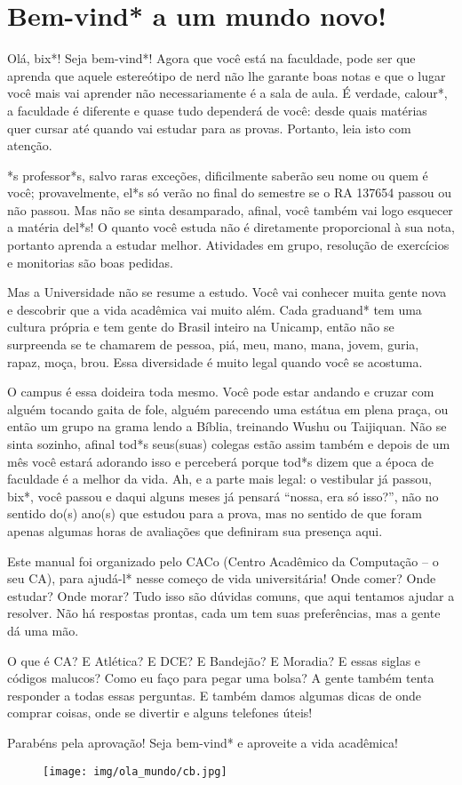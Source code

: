 
\section{Bem-vind* a um mundo novo!}

Olá, bix*! Seja bem-vind*! Agora que você está na faculdade, pode ser que
aprenda que aquele estereótipo de nerd não lhe garante boas notas e que o lugar
você mais vai aprender não necessariamente é a sala de aula. É verdade,
calour*, a faculdade é diferente e quase tudo dependerá de você: desde quais
matérias quer cursar até quando vai estudar para as provas. Portanto, leia isto
com atenção.

*s professor*s, salvo raras exceções, dificilmente saberão seu nome ou quem é
você; provavelmente, el*s só verão no final do semestre se o RA 137654 passou
ou não passou. Mas não se sinta desamparado, afinal, você também vai logo
esquecer a matéria del*s! O quanto você estuda não é diretamente proporcional à
sua nota, portanto aprenda a estudar melhor. Atividades em grupo, resolução de
exercícios e monitorias são boas pedidas.

Mas a Universidade não se resume a estudo. Você vai conhecer muita gente nova e
descobrir que a vida acadêmica vai muito além.  Cada graduand* tem uma cultura
própria e tem gente do Brasil inteiro na Unicamp, então não se surpreenda se te
chamarem de pessoa, piá, meu, mano, mana, jovem, guria, rapaz, moça, brou.
Essa diversidade é muito legal quando você se acostuma.

O campus é essa doideira toda mesmo. Você pode estar andando e cruzar com
alguém tocando gaita de fole, alguém parecendo uma estátua em plena praça, ou
então um grupo na grama lendo a Bíblia, treinando Wushu ou Taijiquan. Não se
sinta sozinho, afinal tod*s seus(suas) colegas estão assim também e depois de
um mês você estará adorando isso e perceberá porque tod*s dizem que a época de
faculdade é a melhor da vida. Ah, e a parte mais legal: o vestibular já passou,
bix*, você passou e daqui alguns meses já pensará ``nossa, era só isso?'', não
no sentido do(s) ano(s) que estudou para a prova, mas no sentido de que foram
apenas algumas horas de avaliações que definiram sua presença aqui.

Este manual foi organizado pelo CACo (Centro Acadêmico da Computação -- o seu
CA), para ajudá-l* nesse começo de vida universitária! Onde comer? Onde
estudar? Onde morar? Tudo isso são dúvidas comuns, que aqui tentamos ajudar a
resolver. Não há respostas prontas, cada um tem suas preferências, mas a gente
dá uma mão.

O que é CA? E Atlética? E DCE? E Bandejão? E Moradia? E essas siglas e códigos
malucos? Como eu faço para pegar uma bolsa? A gente também tenta responder a
todas essas perguntas. E também damos algumas dicas de onde comprar coisas,
onde se divertir e alguns telefones úteis!

Parabéns pela aprovação! Seja bem-vind* e aproveite a vida acadêmica!

\begin{figure}[t]
    \texttt{[image: img/ola\_mundo/cb.jpg]}
\end{figure}
